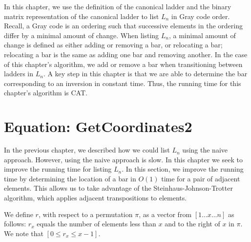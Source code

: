 
In this chapter, we use the definition of the canonical ladder and the binary matrix representation of the canonical ladder to 
list $L_{n}$ in Gray code order. Recall, a Gray code is an ordering such that successive elements in the 
ordering differ 
by a minimal amount of change. When listing $L_{n}$, a minimal amount of change is defined as either adding or removing a bar, 
or relocating a bar; relocating a bar is the same as adding one bar and removing another. In the case of this chapter's 
algorithm, we add or remove a bar when transitioning between ladders in $L_{n}$. A key step in this chapter is that we are able to 
determine the bar corresponding to an inversion in constant time. Thus, the running time for this chapter's algorithm is CAT. 

\section{Equation: GetCoordinates2}
In the previous chapter, we described how 
we could list $L_{n}$ using the naive approach. However, using the naive approach is slow. In this chapter we seek to improve 
the running time for listing $L_{n}$. In this section, we improve the running time by determining the location of a bar in $O(1)$ time for a pair of adjacent elements. 
This allows us to take advantage of the Steinhaus-Johnson-Trotter algorithm, which applies adjacent transpositions to elements.\par  
We define $r$, with respect to a permutation $\pi$, as a vector from $[1 \dots x \dots n]$ as follows: $r_{x}$ equals the number of elements less than $x$ and to the 
right of $x$ in $\pi$. We note that $[0 \leq r_{x} \leq x-1]$. 
